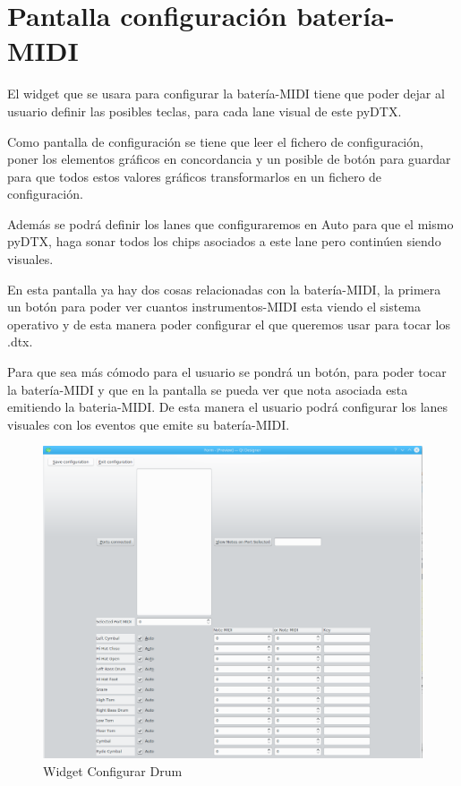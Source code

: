 \documentclass[a4paper,11pt,oneside]{book}
\begin{document}
\section{Pantalla configuración batería-MIDI}
El widget que se usara para configurar la batería-MIDI tiene que poder dejar al usuario definir las posibles teclas, para cada lane visual de este pyDTX.

Como pantalla de configuración se tiene que leer el fichero de configuración, poner los elementos gráficos en concordancia y un posible de botón para guardar para que todos estos valores gráficos transformarlos en un fichero de configuración.

Además se podrá definir los lanes que configuraremos en Auto para que el mismo pyDTX, haga sonar todos los chips asociados a este lane pero continúen siendo visuales.

En esta pantalla ya hay dos cosas relacionadas con la batería-MIDI, la primera un botón para poder ver cuantos instrumentos-MIDI esta viendo el sistema operativo y de esta manera poder configurar el que queremos usar para tocar los .dtx.

Para que sea más cómodo para el usuario se pondrá un botón, para poder tocar la batería-MIDI y que en la pantalla se pueda ver que nota asociada esta emitiendo la bateria-MIDI. De esta manera el usuario podrá configurar los lanes visuales con los eventos que emite su batería-MIDI.

\begin{figure}[H]
\begin{center}
\includegraphics[scale=0.4]{Imagenes/WidgetConfigurarDrum.png}
\caption{Widget Configurar Drum}
\label{Widget Configurar Drum}
\end{center}
\end{figure}
\end{document}
